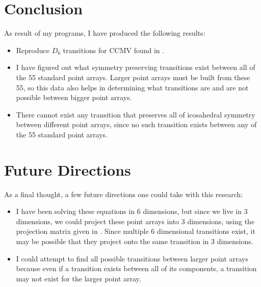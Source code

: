 \documentclass[a4paper,10pt]{article}
\theoremstyle{plain}
\theoremstyle{definition}
\theoremstyle{remark}
\begin{document}

\section{Conclusion}
As result of my programs, I have produced the following results:
\begin{itemize}
    \item Reproduce \(D_6\) transitions for CCMV found in \cite{indelicatoetal2012}.
    \item I have figured out what symmetry preserving transitions exist between all of the 55 standard point arrays. Larger point arrays must be built from these 55, so this data also helps in determining what transitions are and are not possible between bigger point arrays.
    \item There cannot exist any transition that preserves all of icosahedral symmetry between different point arrays, since no such transition exists between any of the 55 standard point arrays.
\end{itemize}

\section{Future Directions}
As a final thought, a few future directions one could take with this research:
\begin{itemize}
    \item I have been solving these equations in 6 dimensions, but since we live in 3 dimensions, we could project these point arrays into 3 dimensions, using the projection matrix given in \cite{indelicatoetal2012}.
    Since multiple 6 dimensional transitions exist, it may be possible that they project onto the same transition in 3 dimensions.
    \item I could attempt to find all possible transitions between larger point arrays because even if a transition exists between all of its components, a transition may not exist for the larger point array.
\end{itemize}

\medskip

\end{document}
